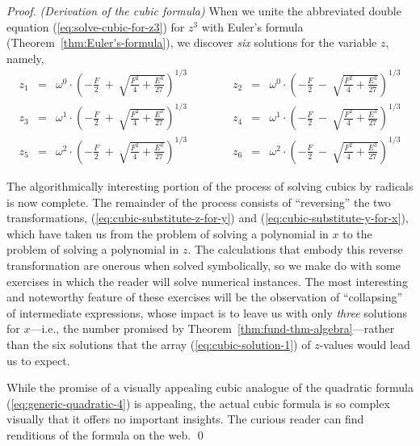 \begin{proof} {\it (Derivation of the cubic formula)}
When we unite the abbreviated double equation (\ref{eq:solve-cubic-for-z3}) for $z^3$ with Euler's formula (Theorem~\ref{thm:Euler's-formula}), we discover {\em six} solutions for the variable $z$, namely, {\small
\begin{equation}
\label{eq:cubic-solution-1}
\begin{array}{ccrrrrrccr}
z_1 & = &
{\displaystyle
\omega^0 \cdot
\left( -\frac{F}{2} \ + \ \sqrt{\frac{F^2}{4} + \frac{E^3}{27}}
\right)^{1/3} 
}
  & & & & &
z_2 & = &
{\displaystyle
\omega^0 \cdot
\left( -\frac{F}{2} \ - \ \sqrt{\frac{F^2}{4} + \frac{E^3}{27}}
\right)^{1/3}
} \\
z_3 & = &
{\displaystyle
\omega^1 \cdot
\left( -\frac{F}{2} \ + \ \sqrt{\frac{F^2}{4} + \frac{E^3}{27}}
\right)^{1/3}
}
  & & & & & 
z_4 & = &
{\displaystyle
\omega^1 \cdot
\left( -\frac{F}{2} \ - \ \sqrt{\frac{F^2}{4} + \frac{E^3}{27}}
\right)^{1/3}
} \\
z_5 & = &
{\displaystyle
\omega^2 \cdot
\left( -\frac{F}{2} \ + \ \sqrt{\frac{F^2}{4} + \frac{E^3}{27}}
\right)^{1/3}
}
  & & & & &
z_6 & = &
{\displaystyle
\omega^2 \cdot
\left( -\frac{F}{2} \ - \ \sqrt{\frac{F^2}{4} + \frac{E^3}{27}}
\right)^{1/3}
}
\end{array}
\end{equation}
}

\smallskip

The algorithmically interesting portion of the process of solving cubics by radicals is now complete.  The remainder of the process consists of ``reversing'' the two transformations,
(\ref{eq:cubic-substitute-z-for-y}) and (\ref{eq:cubic-substitute-y-for-x}), which have taken us from the problem of solving a polynomial in $x$ to the problem of solving a polynomial in $z$.  The calculations that embody this reverse transformation are onerous when solved symbolically, so we make do with some exercises in which the reader will solve numerical instances.  The most interesting and noteworthy feature of these exercises will be the observation of ``collapsing'' of intermediate expressions, whose impact is to leave us with only {\em three} solutions for $x$---i.e., the number promised by Theorem~\ref{thm:fund-thm-algebra}---rather than the six solutions that the array (\ref{eq:cubic-solution-1}) of $z$-values would lead us to expect.

\smallskip

While the promise of a visually appealing cubic analogue of the quadratic formula (\ref{eq:generic-quadratic-4}) is appealing, the actual cubic formula is so complex visually that it offers no important insights.  The curious reader can find renditions of the formula on the web. \qed
\end{proof}

